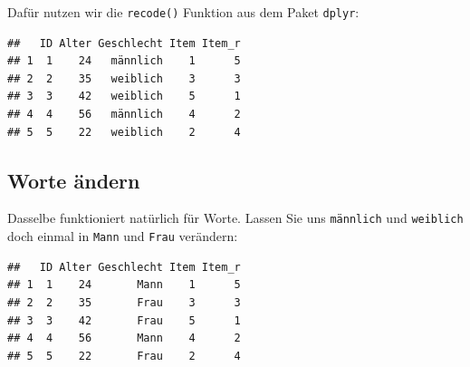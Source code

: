 \documentclass[
]{book}
\newenvironment{Shaded}{\begin{snugshade}}{\end{snugshade}}
\newcommand{\DecValTok}[1]{\textcolor[rgb]{0.00,0.00,0.81}{#1}}
\newcommand{\FunctionTok}[1]{\textcolor[rgb]{0.13,0.29,0.53}{\textbf{#1}}}
\newcommand{\NormalTok}[1]{#1}
\newcommand{\OtherTok}[1]{\textcolor[rgb]{0.56,0.35,0.01}{#1}}
\newcommand{\SpecialCharTok}[1]{\textcolor[rgb]{0.81,0.36,0.00}{\textbf{#1}}}
\newcommand{\StringTok}[1]{\textcolor[rgb]{0.31,0.60,0.02}{#1}}
\begin{document}
Dafür nutzen wir die \texttt{recode()} Funktion aus dem Paket \texttt{dplyr}:

\begin{Shaded}
\end{Shaded}

\begin{verbatim}
##   ID Alter Geschlecht Item Item_r
## 1  1    24   männlich    1      5
## 2  2    35   weiblich    3      3
## 3  3    42   weiblich    5      1
## 4  4    56   männlich    4      2
## 5  5    22   weiblich    2      4
\end{verbatim}

\subsection{Worte ändern}\label{worte-uxe4ndern}

Dasselbe funktioniert natürlich für Worte. Lassen Sie uns \texttt{männlich} und \texttt{weiblich} doch einmal in \texttt{Mann} und \texttt{Frau} verändern:

\begin{Shaded}
\end{Shaded}

\begin{verbatim}
##   ID Alter Geschlecht Item Item_r
## 1  1    24       Mann    1      5
## 2  2    35       Frau    3      3
## 3  3    42       Frau    5      1
## 4  4    56       Mann    4      2
## 5  5    22       Frau    2      4
\end{verbatim}
\end{document}

